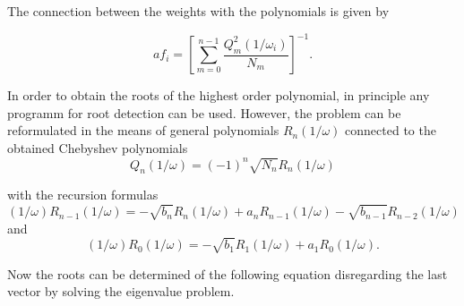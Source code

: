 The connection between the weights with the polynomials is given by

\begin{equation}a  \label{equation:poly_weights}
  f_i = \left[ \sum\limits_{m=0}^{n-1} \frac{Q_m^2(1/\omega_i)}{N_m} \right]^{-1} .
\end{equation}

In order to obtain the roots of the highest order polynomial, in principle
any programm for root detection can be used. However, the problem can
be reformulated in the means of general polynomials $R_n(1/\omega)$ connected
to the obtained Chebyshev polynomials
\begin{equation}
  Q_n(1/\omega) = (-1)^n \sqrt{N_n} R_n(1/\omega)
\end{equation}

with the recursion formulas
\begin{equation}
  (1/\omega)R_{n-1}(1/\omega) = - \sqrt{b_n}R_n(1/\omega) + a_nR_{n-1}(1/\omega)
                                - \sqrt{b_{n-1}} R_{n-2}(1/\omega)
\end{equation}
and
\begin{equation}
  (1/\omega)R_0(1/\omega) = - \sqrt{b_1}R_1(1/\omega) + a_1 R_0(1/\omega) .
\end{equation}

Now the roots can be determined of the following equation disregarding the
last vector by solving the eigenvalue problem.

